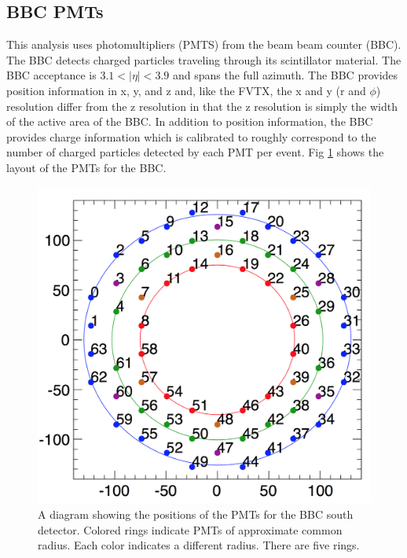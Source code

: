 \subsection{BBC PMTs}
This analysis uses photomultipliers (PMTS) from the beam beam counter (BBC). The BBC detects charged particles traveling through its scintillator material. The BBC acceptance is $3.1 < |\eta| < 3.9$ and spans the full azimuth. The BBC provides position information in x, y, and z and, like the FVTX, the x and y (r and $\phi$) resolution differ from the z resolution in that the z resolution is simply the width of the active area of the BBC. In addition to position information, the BBC provides charge information which is calibrated to roughly correspond to the number of charged particles detected by each PMT per event. Fig \ref{fig:bbc_rings} shows the layout of the PMTs for the BBC.
\begin{figure}[h!]
\begin{center}
\includegraphics[width=0.55\linewidth]{figs/bbc_rings.png}
\caption{A diagram showing the positions of the PMTs for the BBC south detector. Colored rings indicate PMTs of approximate common radius. Each color indicates a different radius. There are five rings.}
\label{fig:bbc_rings}
\end{center}
\end{figure}
